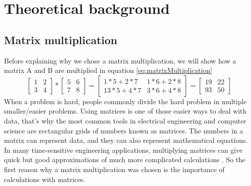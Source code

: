 %
%

\chapter{Theoretical background}
	\section{Matrix multiplication}
Before explaining why we chose a matrix multiplication, we will show how a matrix A and B are multiplied in equation \ref{eq:matrixMultiplication}
\begin{equation} \label{eq:matrixMultiplication}
	 \begin{bmatrix}
	1 & 2 \\[0.2em]
	3 & 4
	\end{bmatrix}
	*
	 \begin{bmatrix}
	5 & 6 \\[0.2em]
	7 & 8
	\end{bmatrix}
	=
	 \begin{bmatrix}
	1*5+2*7 & 1*6+2*8 \\[0.2em]
	13*5+4*7 & 3*6+4*8
	\end{bmatrix}
	=
	 \begin{bmatrix}
	19 & 22 \\[0.2em]
	93 & 50
	\end{bmatrix}
\end{equation}
When a problem is hard, people commonly divide the hard problem in multiple smaller/easier problems. Using matrices is one of those easier ways to deal with data, that's why the most common tools in electrical engineering and computer science are rectangular grids of numbers known as matrices. The numbers in a matrix can represent data, and they can also represent mathematical equations. In many time-sensitive engineering applications, multiplying matrices can give quick but good approximations of much more complicated calculations \cite{Hardesty2013}. So the first reason why a matrix multiplication was chosen is the importance of calculations with matrices.\\
